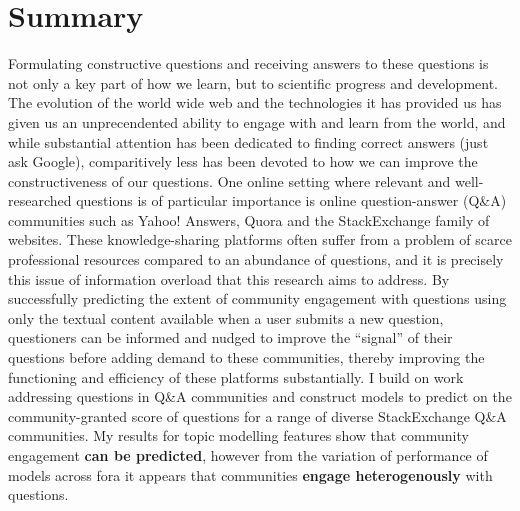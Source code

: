 \documentclass[11pt,preprint, authoryear]{article}
\title{
{\scshape\Large Department of Statistics 2019}\\
{\vskip 2.5em \scshape Predicting Community Engagement with Questions Across Online
Question-Answer Fora}\\
}
\author{Candidate Number: 10140}
\subtitle{\vspace{4em} Submitted for the Master of Science, London School of Economics,
University of London} %
\date{\scshape August 2019}
\numberwithin{equation}{section}
\begin{document}
\pagestyle{fancy}
\chead{}
\rhead{}
\lfoot{}
\rfoot{} 
\lhead{}
\cfoot{\footnotesize \thepage\\}


\maketitle

\thispagestyle{empty}

\clearpage

\setcounter{page}{1}

\renewcommand{\contentsname}{Table of Contents}
\hypersetup{linkcolor=black}
\tableofcontents
\newpage
\hypersetup{linkcolor=black}
\listoffigures
\newpage
\hypersetup{linkcolor=black}
\listoftables
\hypersetup{linkcolor=black}
\newpage

\section*{Summary}

Formulating constructive questions and receiving answers to these
questions is not only a key part of how we learn, but to scientific
progress and development. The evolution of the world wide web and the
technologies it has provided us has given us an unprecendented ability
to engage with and learn from the world, and while substantial attention
has been dedicated to finding correct answers (just ask Google),
comparitively less has been devoted to how we can improve the
constructiveness of our questions. One online setting where relevant and
well-researched questions is of particular importance is online
question-answer (Q\&A) communities such as Yahoo! Answers, Quora and the
StackExchange family of websites. These knowledge-sharing platforms
often suffer from a problem of scarce professional resources compared to
an abundance of questions, and it is precisely this issue of information
overload that this research aims to address. By successfully predicting
the extent of community engagement with questions using only the textual
content available when a user submits a new question, questioners can be
informed and nudged to improve the ``signal'' of their questions before
adding demand to these communities, thereby improving the functioning
and efficiency of these platforms substantially. I build on work
addressing questions in Q\&A communities and construct models to predict
on the community-granted score of questions for a range of diverse
StackExchange Q\&A communities. My results for topic modelling features
show that community engagement \textbf{can be predicted}, however from
the variation of performance of models across fora it appears that
communities \textbf{engage heterogenously} with questions.
\end{document}
